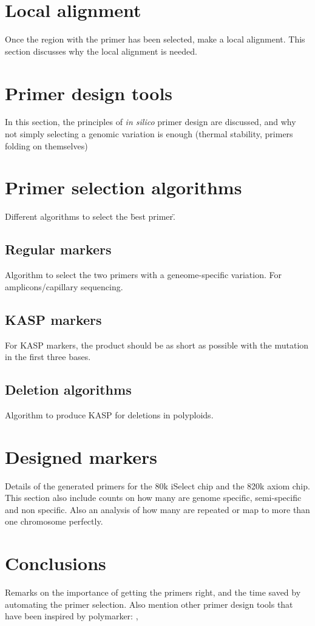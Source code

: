 \section{Local alignment} 
Once the region with the primer has been selected, make a local alignment. This section discusses why the local alignment is needed. 

\section{Primer design tools} 
In this section, the principles of \textit{in silico} primer design are discussed, and why not simply selecting a genomic variation is enough (thermal stability, primers folding on themselves)

\section{Primer selection algorithms} 
Different algorithms to select the \"best primer\". 

\subsection{Regular markers}  
Algorithm to select the two primers with a geneome-specific variation. For amplicons/capillary sequencing. 

\subsection{KASP markers} 
For KASP markers, the product should be as short as possible with the mutation in the first three bases. 

\subsection{Deletion algorithms}
Algorithm to produce KASP for deletions in polyploids. 

\section{Designed markers} Details of the generated primers for the 80k iSelect chip and the 820k axiom chip. This section also include counts on how many are genome specific, semi-specific and non specific. Also an analysis of how many are repeated or map to more than one chromosome perfectly.

\section{Conclusions} Remarks on the importance of getting the primers right, and the time saved by automating the primer selection. Also mention other primer design tools that have been inspired by polymarker: \cite{Ma2015}, \cite{Wang2016}

